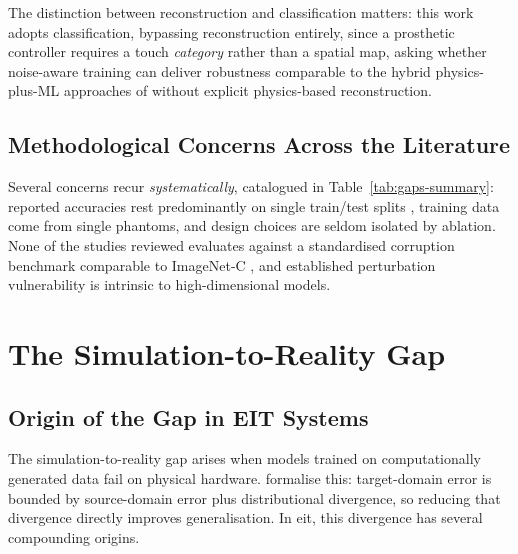 The distinction between reconstruction and classification matters: this work adopts classification, bypassing reconstruction entirely, since a prosthetic controller requires a touch \emph{category} rather than a spatial map, asking whether noise-aware training can deliver robustness comparable to the hybrid physics-plus-ML approaches of \textcite{chen2023} without explicit physics-based reconstruction.

\subsection{Methodological Concerns Across the Literature}
\label{sec:lit-ml-concerns}

Several concerns recur \emph{systematically}, catalogued in Table~\ref{tab:gaps-summary}: reported accuracies rest predominantly on single train/test splits \parencite{park2022skin, tao2023, yu2024, chen2023}, training data come from single phantoms, and design choices are seldom isolated by ablation. None of the studies reviewed evaluates against a standardised corruption benchmark comparable to ImageNet-C \parencite{hendrycks2019}, and \textcite{goodfellow2015adversarial} established perturbation vulnerability is intrinsic to high-dimensional models.

\section{The Simulation-to-Reality Gap}
\label{sec:lit-sim2real}

\subsection{Origin of the Gap in EIT Systems}
\label{sec:lit-sim2real-origin}

The simulation-to-reality gap arises when models trained on computationally generated data fail on physical hardware. \textcite{ben-david2010domain} formalise this: target-domain error is bounded by source-domain error plus distributional divergence, so reducing that divergence directly improves generalisation. In \gls{eit}, this divergence has several compounding origins.

